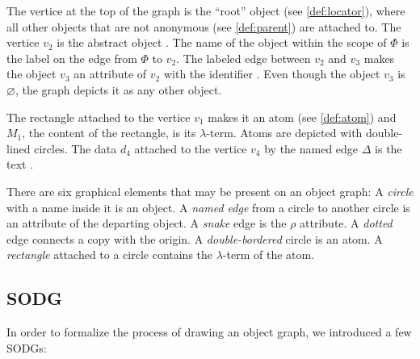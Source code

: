 The vertice at the top of the graph is the ``root'' object (see \cref{def:locator}),
where all other objects that are not anonymous (see \cref{def:parent}) are attached to.
The vertice \(v_2\) is the abstract object . The name of the object within the
scope of \(\Phi\) is the label on the edge from \(\Phi\) to \(v_2\). The labeled edge
between \(v_2\) and \(v_3\) makes the object \(v_3\) an attribute of \(v_2\) with the
identifier . Even though the object \(v_3\) is \(\varnothing\), the graph
depicts it as any other object.

The rectangle attached to the vertice \(v_1\) makes it an atom (see \cref{def:atom})
and \(M_1\), the content of the rectangle, is its \(\lambda\)-term. Atoms
are depicted with double-lined circles. The data \(d_4\)
attached to the vertice \(v_4\) by the named edge \(\Delta\)
is the text .

There are six graphical elements that may be present on an object graph:
A \emph{circle} with a name inside it is an object.
A \emph{named edge} from a circle to another circle is an attribute of the departing object.
A \emph{snake} edge is the \(\rho\) attribute.
A \emph{dotted} edge connects a copy with the origin.
A \emph{double-bordered} circle is an atom.
A \emph{rectangle} attached to a circle contains the \(\lambda\)-term of the atom.

\subsection{SODG}

In order to formalize the process of drawing an object graph,
we introduced a few SODGs:

